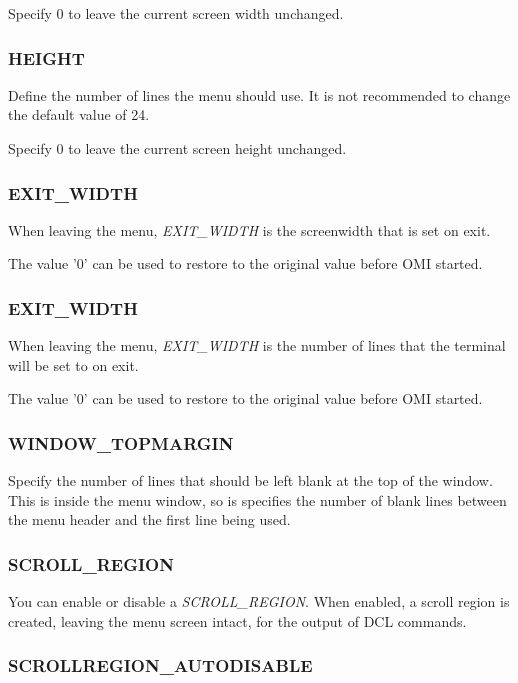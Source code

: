 \documentclass[a4paper]{book}
\begin{document}
Specify 0 to leave the current screen width unchanged.

\subsubsection{HEIGHT}

Define the number of lines the menu should use. It is not recommended to 
change the default value of 24.

Specify 0 to leave the current screen height unchanged.

\subsubsection{EXIT{\_}WIDTH}

When leaving the menu, \textsl{EXIT{\_}WIDTH} is the screenwidth that is set on 
exit.

The value '0' can be used to restore to the original value before OMI started.

\subsubsection{EXIT{\_}WIDTH}

When leaving the menu, \textsl{EXIT{\_}WIDTH} is the number of lines that the terminal will be set to on exit.

The value '0' can be used to restore to the original value before OMI started.

\subsubsection{WINDOW{\_}TOPMARGIN}

Specify the number of lines that should be left blank at the top of the 
window. This is inside the menu window, so is specifies the number of blank 
lines between the menu header and the first line being used.

\subsubsection{SCROLL{\_}REGION}

You can enable or disable a \textsl{SCROLL{\_}REGION}. When enabled, a scroll region 
is created, leaving the menu screen intact, for the output of DCL commands.

\subsubsection{SCROLLREGION{\_}AUTODISABLE}
\end{document}
